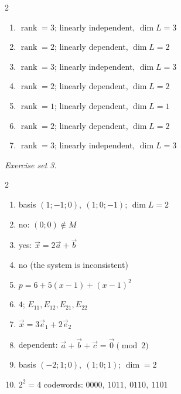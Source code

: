 \begin{multicols}{2}
\begin{enumerate}[label=\arabic*., leftmargin=*, itemsep=1pt]
\item $\operatorname{rank}=3$; linearly independent, $\dim L=3$
\item $\operatorname{rank}=2$; linearly dependent, $\dim L=2$
\item $\operatorname{rank}=3$; linearly independent, $\dim L=3$
\item $\operatorname{rank}=2$; linearly dependent, $\dim L=2$
\item $\operatorname{rank}=1$; linearly dependent, $\dim L=1$
\item $\operatorname{rank}=2$; linearly dependent, $\dim L=2$
\item $\operatorname{rank}=3$; linearly independent, $\dim L=3$
\end{enumerate}
\end{multicols}
\par\noindent\emph{Exercise set 3.}\nopagebreak
\begin{multicols}{2}\raggedright
\begin{enumerate}[label=\arabic*., leftmargin=*, itemsep=1pt]
\item basis $(1;-1;0),\ (1;0;-1)$; $\dim L=2$
\item no: $(0;0)\notin M$
\item yes: $\vec x=2\vec a+\vec b$
\item no (the system is inconsistent)
\item $p=6+5(x-1)+(x-1)^2$
\item $4$; $E_{11},E_{12},E_{21},E_{22}$
\item $\vec x=3\vec e_1+2\vec e_2$
\item dependent: $\vec a+\vec b+\vec c=\vec 0 \pmod 2$
\item basis $(-2;1;0),\ (1;0;1)$; $\dim=2$
\item $2^2=4$ codewords: $0000,\ 1011,\ 0110,\ 1101$
\end{enumerate}
\end{multicols}
